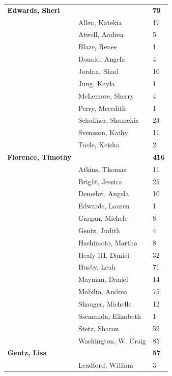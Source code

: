 \documentclass{article}\usepackage[]{graphicx}\usepackage[]{color}
\begin{document}
{\begin{longtable} { >{\raggedright}p{}|p{}p{}}
   \rowcolor[gray]{0.90}\textbf{Edwards, Sheri} &  & \hspace{2cm}\textbf{79} \\ 
   \rowcolor[gray]{0.90} & Allen, Katekia & 17 \\ 
   & Atwell, Andrea & 5 \\ 
   & Blaze, Renee & 1 \\ 
   & Donald, Angela & 4 \\ 
   \rowcolor[gray]{0.90} & Jordan, Shad & 10 \\ 
   \rowcolor[gray]{0.90} & Jung, Kayla & 1 \\ 
   \rowcolor[gray]{0.90} & McLemore, Sherry & 4 \\ 
   & Perry, Meredith & 1 \\ 
   & Schoffner, Shamekia & 23 \\ 
   & Svensson, Kathy & 11 \\ 
   \rowcolor[gray]{0.90} & Toole, Keisha & 2 \\ 
   \rowcolor[gray]{0.90}\textbf{Florence, Timothy} &  & \hspace{2cm}\textbf{416} \\ 
   \rowcolor[gray]{0.90} & Atkins, Thomas & 11 \\ 
   & Bright, Jessica & 25 \\ 
   & Demehri, Angela & 10 \\ 
   & Edwards, Lauren & 1 \\ 
   \rowcolor[gray]{0.90} & Gargan, Michele & 8 \\ 
   \rowcolor[gray]{0.90} & Gentz, Judith & 4 \\ 
   \rowcolor[gray]{0.90} & Hashimoto, Martha & 8 \\ 
   & Healy III, Daniel & 32 \\ 
   & Husby, Leah & 71 \\ 
   & Mayman, Daniel & 14 \\ 
   \rowcolor[gray]{0.90} & Mobilio, Andrea & 75 \\ 
   \rowcolor[gray]{0.90} & Shauger, Michelle & 12 \\ 
   \rowcolor[gray]{0.90} & Ssemanda, Elizabeth & 1 \\ 
   & Stetz, Sharon & 59 \\ 
   & Washington, W. Craig & 85 \\ 
  \textbf{Gentz, Lisa} &  & \hspace{2cm}\textbf{57} \\ 
   \rowcolor[gray]{0.90} & Leadford, William & 3 \\ 

\end{longtable}}
\end{document}
